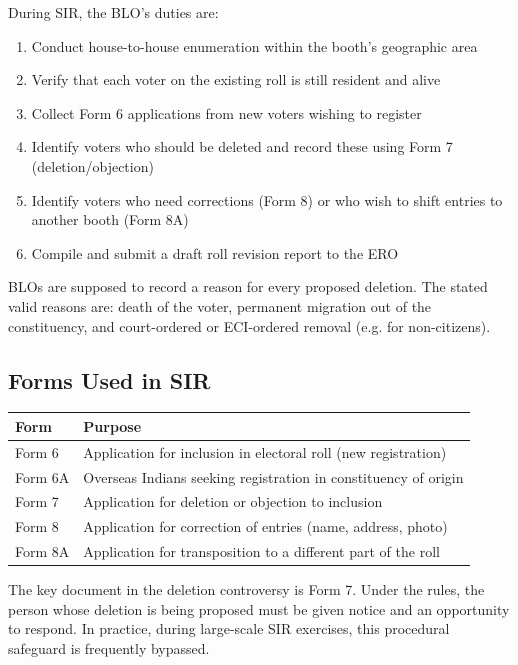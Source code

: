 \documentclass[11pt, a4paper]{article}
\begin{document}
During SIR, the BLO's duties are:

\begin{enumerate}[leftmargin=1.5em, itemsep=4pt]
  \item Conduct house-to-house enumeration within the booth's geographic area
  \item Verify that each voter on the existing roll is still resident and alive
  \item Collect Form 6 applications from new voters wishing to register
  \item Identify voters who should be deleted and record these using Form 7 (deletion/objection)
  \item Identify voters who need corrections (Form 8) or who wish to shift entries to another booth (Form 8A)
  \item Compile and submit a draft roll revision report to the ERO
\end{enumerate}

BLOs are supposed to record a reason for every proposed deletion. The stated valid reasons are: death of the voter, permanent migration out of the constituency, and court-ordered or ECI-ordered removal (e.g. for non-citizens).

\subsection{Forms Used in SIR}

\begin{tabularx}{\linewidth}{lX}
\toprule
\textbf{Form} & \textbf{Purpose} \\
\midrule
Form 6  & Application for inclusion in electoral roll (new registration) \\
Form 6A & Overseas Indians seeking registration in constituency of origin \\
Form 7  & Application for deletion or objection to inclusion \\
Form 8  & Application for correction of entries (name, address, photo) \\
Form 8A & Application for transposition to a different part of the roll \\
\bottomrule
\end{tabularx}

\vspace{0.5em}

The key document in the deletion controversy is Form 7. Under the rules, the person whose deletion is being proposed must be given notice and an opportunity to respond. In practice, during large-scale SIR exercises, this procedural safeguard is frequently bypassed.
\end{document}
